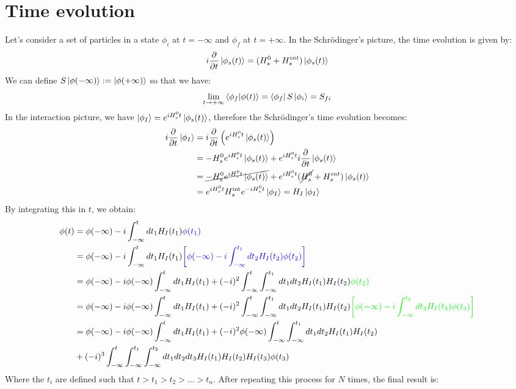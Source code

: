 \documentclass[../main.tex]{subfiles}
\begin{document}
\section{Time evolution}
Let's consider a set of particles in a state $\phi_i$ at $t=-\infty$ and $\phi_f$ at $t=+\infty$. In the Schr\"odinger's picture, the time evolution is given by:
\[
i\frac{\partial}{\partial t}\ket{\phi_s(t)}=(H_s^0+H_s^{int})\ket{\phi_s(t)}
\]
We can define $S\ket{\phi(-\infty)}:=\ket{\phi(+\infty)}$ so that we have:
\[
\lim_{t\to+\infty}\bra{\phi_f}\ket{\phi(t)}=\bra{\phi_f}S\ket{\phi_i}=S_{fi}
\]
In the interaction picture, we have $\ket{\phi_I}=e^{iH_s^0t}\ket{\phi_s(t)}$, therefore the Schr\"odinger's time evolution becomes:
\begin{align*}
i\frac{\partial}{\partial t}\ket{\phi_I}&=i\frac{\partial}{\partial t}\left(e^{iH_s^0t}\ket{\phi_s(t)}\right)\\
&=-H_s^0e^{iH_s^0t}\ket{\phi_s(t)}+e^{iH_s^0t}i\frac{\partial}{\partial t}\ket{\phi_s(t)}\\
&=\cancel{-H_s^0e^{iH_s^0t}\ket{\phi_s(t)}}+e^{iH_s^0t}(\cancel{H_s^0}+H_s^{int})\ket{\phi_s(t)}\\
&=e^{iH_s^0t}H_s^{\text{int}}e^{-iH_s^0t}\ket{\phi_I}=H_I\ket{\phi_I}
\end{align*}
By integrating this in $t$, we obtain:
\begin{align*}
\phi(t)&=\phi(-\infty)-i\int_{-\infty}^tdt_1H_I(t_1){\color{blue}\phi(t_1)}\\
&=\phi(-\infty)-i\int_{-\infty}^tdt_1H_I(t_1){\color{blue}\left[\phi(-\infty)-i\int_{-\infty}^{t_1}dt_2H_I(t_2)\phi(t_2)\right]}\\
&=\phi(-\infty)-i\phi(-\infty)\int_{-\infty}^tdt_1H_I(t_1)+(-i)^2\int_{-\infty}^t\int_{-\infty}^{t_1}dt_1dt_2H_I(t_1)H_I(t_2){\color{green}\phi(t_2)}\\
&=\phi(-\infty)-i\phi(-\infty)\int_{-\infty}^tdt_1H_I(t_1)+(-i)^2\int_{-\infty}^t\int_{-\infty}^{t_1}dt_1dt_2H_I(t_1)H_I(t_2){\color{green}\left[\phi(-\infty)-i\int_{-\infty}^{t_2}dt_3H_I(t_3)\phi(t_3)\right]}\\
&=\phi(-\infty)-i\phi(-\infty)\int_{-\infty}^tdt_1H_I(t_1)+(-i)^2\phi(-\infty)\int_{-\infty}^t\int_{-\infty}^{t_1}dt_1dt_2H_I(t_1)H_I(t_2)\\
&+(-i)^3\int_{-\infty}^{t}\int_{-\infty}^{t_1}\int_{-\infty}^{t_2}dt_1dt_2dt_3H_I(t_1)H_I(t_2)H_I(t_3)\phi(t_3)
\end{align*}
Where the $t_i$ are defined such that $t>t_1>t_2>\dots>t_n$. After repeating this process for $N$ times, the final result is:
\end{document}
